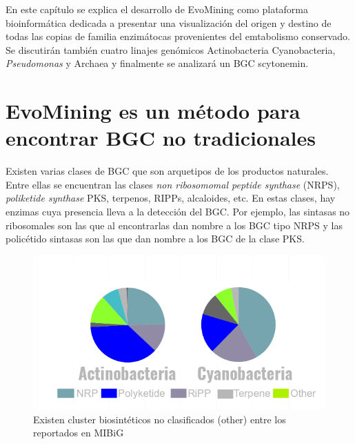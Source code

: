 \documentclass[12pt,twoside]{reedthesis}
\begin{document}
  En este capítulo se explica el desarrollo de EvoMining como plataforma
  bioinformática dedicada a presentar una visualización del origen y
  destino de todas las copias de familia enzimátocas provenientes del
  emtabolismo conservado. Se discutirán también cuatro linajes genómicos
  Actinobacteria Cyanobacteria, \emph{Pseudomonas} y Archaea y finalmente
  se analizará un BGC scytonemin.
  
  \section{EvoMining es un método para encontrar BGC no
  tradicionales}\label{evomining-es-un-metodo-para-encontrar-bgc-no-tradicionales}
  
  Existen varias clases de BGC que son arquetipos de los productos
  naturales. Entre ellas se encuentran las clases \emph{non ribosomomal
  peptide synthase} (NRPS), \emph{poliketide synthase} PKS, terpenos,
  RIPPs, alcaloides, etc. En estas clases, hay enzimas cuya presencia
  lleva a la detección del BGC. Por ejemplo, las sintasas no ribosomales
  son las que al encontrarlas dan nombre a los BGC tipo NRPS y las
  policétido sintasas son las que dan nombre a los BGC de la clase PKS.
  
  \begin{figure}[h!tbp]
  \centering
  \includegraphics[angle = 0,scale = .7]{chapter2/other.png}
  \caption[Existen cluster biosintéticos no clasificados (other) entre los reportados en MIBiG]{\footnotesize{Existen cluster biosintéticos no clasificados (other) entre los reportados en MIBiG}}
  \label{fig:other}
  \end{figure}
  
\end{document}
